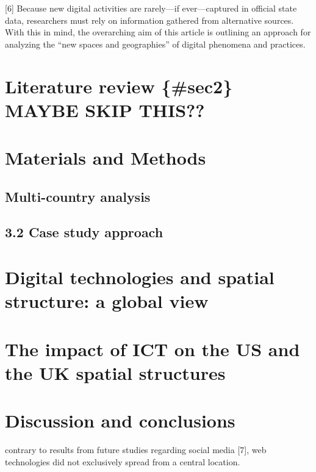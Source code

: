 \documentclass[10pt,letterpaper]{article}
\begin{document}
{[}6{]} Because new digital activities are rarely---if ever---captured
in official state data, researchers must rely on information gathered
from alternative sources. With this in mind, the overarching aim of this
article is outlining an approach for analyzing the ``new spaces and
geographies'' of digital phenomena and practices.

\hypertarget{literature-review-sec2-maybe-skip-this}{%
\section{Literature review \{\#sec2\} MAYBE SKIP
THIS??}\label{literature-review-sec2-maybe-skip-this}}

\hypertarget{sec3}{%
\section{Materials and Methods}\label{sec3}}

\hypertarget{sec3.1}{%
\subsection{Multi-country analysis}\label{sec3.1}}

\hypertarget{sec3.2}{%
\subsection{3.2 Case study approach}\label{sec3.2}}

\hypertarget{sec4}{%
\section{Digital technologies and spatial structure: a global
view}\label{sec4}}

\hypertarget{sec5}{%
\section{The impact of ICT on the US and the UK spatial
structures}\label{sec5}}

\hypertarget{sec6}{%
\section{Discussion and conclusions}\label{sec6}}

contrary to results from future studies regarding social media {[}7{]},
web technologies did not exclusively spread from a central location.
\end{document}
